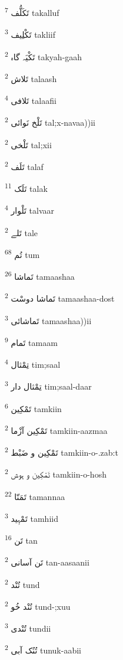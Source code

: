 \documentclass[12pt]{article}
\begin{document}
\begin{RTL}
\begin{multicols}{5}
{\ur تَکَلُّف}   \textsuperscript{7} takalluf

{\ur تَکْلِیف}   \textsuperscript{3} takliif

{\ur تَکْیَہ گاہ}   \textsuperscript{2} takyah-gaah

{\ur تَلاش}   \textsuperscript{2} talaash

{\ur تَلافی}   \textsuperscript{4} talaafii

{\ur تَلْخ نَوائی}   \textsuperscript{2} tal;x-navaa))ii

{\ur تَلْخی}   \textsuperscript{2} tal;xii

{\ur تَلَف}   \textsuperscript{2} talaf

{\ur تَلَک}   \textsuperscript{11} talak

{\ur تَلْوار}   \textsuperscript{4} talvaar

{\ur تَلے}   \textsuperscript{2} tale

{\ur تُم}   \textsuperscript{68} tum

{\ur تَماشا}   \textsuperscript{26} tamaashaa

{\ur تَماشا دوسْت}   \textsuperscript{2} tamaashaa-dost

{\ur تَماشائی}   \textsuperscript{3} tamaashaa))ii

{\ur تَمام}   \textsuperscript{9} tamaam

{\ur تِمْثال}   \textsuperscript{4} tim;saal

{\ur تِمْثال دار}   \textsuperscript{3} tim;saal-daar

{\ur تَمْکِین}   \textsuperscript{6} tamkiin

{\ur تَمْکِین آزْما}   \textsuperscript{2} tamkiin-aazmaa

{\ur تَمْکِین و ضَبْط}   \textsuperscript{2} tamkiin-o-.zab:t

{\ur تَمْکِین و ہوش}   \textsuperscript{2} tamkiin-o-hosh

{\ur تَمَنّا}   \textsuperscript{22} tamannaa

{\ur تَمْہِید}   \textsuperscript{3} tamhiid

{\ur تَن}   \textsuperscript{16} tan

{\ur تَن آسانی}   \textsuperscript{2} tan-aasaanii

{\ur تُنْد}   \textsuperscript{2} tund

{\ur تُنْد خُو}   \textsuperscript{2} tund-;xuu

{\ur تُنْدی}   \textsuperscript{3} tundii

{\ur تُنُک آبی}   \textsuperscript{2} tunuk-aabii


\end{multicols}
\end{RTL}
\end{document}
